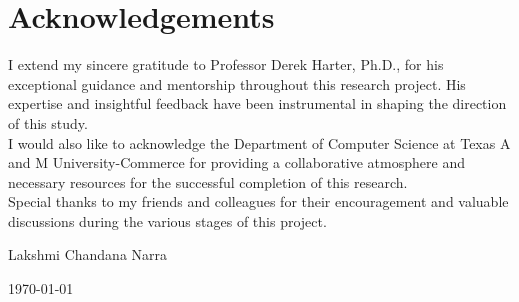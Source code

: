 \chapter*{\center \Large  Acknowledgements}
I extend my sincere gratitude to Professor Derek Harter, Ph.D., for his exceptional guidance and mentorship throughout this research project. His expertise and insightful feedback have been instrumental in shaping the direction of this study.\\

I would also like to acknowledge the Department of Computer Science at Texas A and M University-Commerce for providing a collaborative atmosphere and necessary resources for the successful completion of this research.\\

Special thanks to my friends and colleagues for their encouragement and valuable discussions during the various stages of this project.


\begin{flushright}
	
	Lakshmi Chandana Narra 
    
    \today
    \end{flushright}

